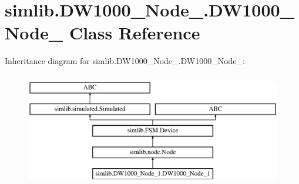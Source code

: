 \hypertarget{classsimlib_1_1_d_w1000___node__1_1_1_d_w1000___node__1}{}\section{simlib.\+D\+W1000\+\_\+\+Node\+\_.\+D\+W1000\+\_\+\+Node\+\_ Class Reference}
\label{classsimlib_1_1_d_w1000___node__1_1_1_d_w1000___node__1}
Inheritance diagram for simlib.\+D\+W1000\+\_\+\+Node\+\_.\+D\+W1000\+\_\+\+Node\+\_\+:\begin{figure}[H]
\begin{center}
\leavevmode
\includegraphics[height=5.000000cm]{classsimlib_1_1_d_w1000___node__1_1_1_d_w1000___node__1}
\end{center}
\end{figure}
